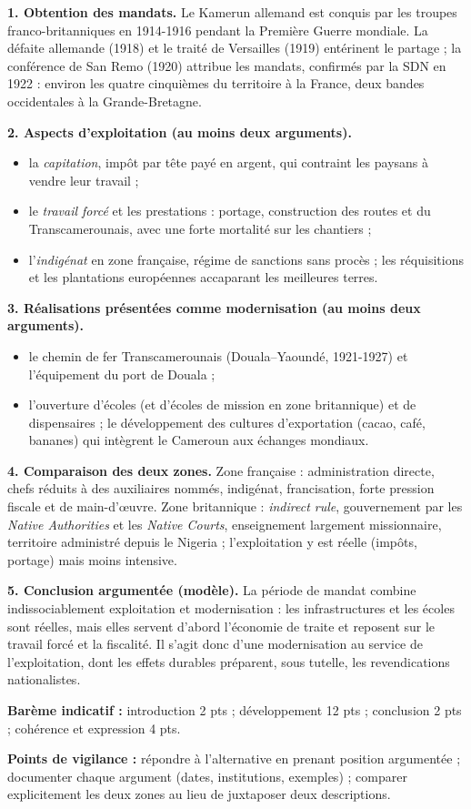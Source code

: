 \documentclass[11pt]{article}
\begin{document}
\begin{corrige}
\textbf{1. Obtention des mandats.} Le Kamerun allemand est conquis par les troupes franco-britanniques en 1914-1916 pendant la Première Guerre mondiale. La défaite allemande (1918) et le traité de Versailles (1919) entérinent le partage ; la conférence de San Remo (1920) attribue les mandats, confirmés par la SDN en 1922 : environ les quatre cinquièmes du territoire à la France, deux bandes occidentales à la Grande-Bretagne.

\textbf{2. Aspects d'exploitation (au moins deux arguments).}
\begin{itemize}
\item la \emph{capitation}, impôt par tête payé en argent, qui contraint les paysans à vendre leur travail ;
\item le \emph{travail forcé} et les prestations : portage, construction des routes et du Transcamerounais, avec une forte mortalité sur les chantiers ;
\item l'\emph{indigénat} en zone française, régime de sanctions sans procès ; les réquisitions et les plantations européennes accaparant les meilleures terres.
\end{itemize}

\textbf{3. Réalisations présentées comme modernisation (au moins deux arguments).}
\begin{itemize}
\item le chemin de fer Transcamerounais (Douala--Yaoundé, 1921-1927) et l'équipement du port de Douala ;
\item l'ouverture d'écoles (et d'écoles de mission en zone britannique) et de dispensaires ; le développement des cultures d'exportation (cacao, café, bananes) qui intègrent le Cameroun aux échanges mondiaux.
\end{itemize}

\textbf{4. Comparaison des deux zones.} Zone française : administration directe, chefs réduits à des auxiliaires nommés, indigénat, francisation, forte pression fiscale et de main-d'œuvre. Zone britannique : \emph{indirect rule}, gouvernement par les \emph{Native Authorities} et les \emph{Native Courts}, enseignement largement missionnaire, territoire administré depuis le Nigeria ; l'exploitation y est réelle (impôts, portage) mais moins intensive.

\textbf{5. Conclusion argumentée (modèle).} La période de mandat combine indissociablement exploitation et modernisation : les infrastructures et les écoles sont réelles, mais elles servent d'abord l'économie de traite et reposent sur le travail forcé et la fiscalité. Il s'agit donc d'une modernisation au service de l'exploitation, dont les effets durables préparent, sous tutelle, les revendications nationalistes.

\textbf{Barème indicatif :} introduction 2 pts ; développement 12 pts ; conclusion 2 pts ; cohérence et expression 4 pts.

\textbf{Points de vigilance :} répondre à l'alternative en prenant position argumentée ; documenter chaque argument (dates, institutions, exemples) ; comparer explicitement les deux zones au lieu de juxtaposer deux descriptions.
\end{corrige}
\end{document}
